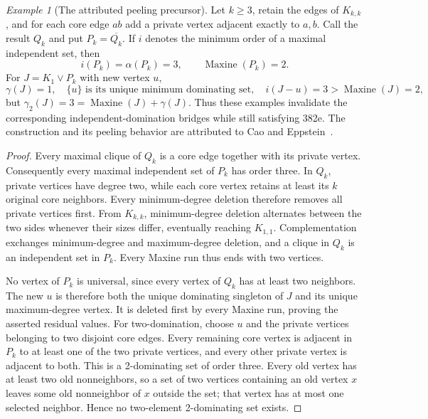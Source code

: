 \documentclass[11pt,a4paper]{article}
\theoremstyle{definition}\newtheorem{definition}[theorem]{Definition}
\theoremstyle{remark}\newtheorem{remark}[theorem]{Remark}
\newtheorem{example}[theorem]{Example}
\begin{document}
\begin{example}[The attributed peeling precursor]\label{late:382e:precursor}
Let $k\ge3$, retain the edges of $K_{k,k}$, and for each core edge $ab$
add a private vertex adjacent exactly to $a,b$. Call the result $Q_k$
and put $P_k=\overline{Q_k}$. If $i$ denotes the minimum order of a
maximal independent set, then
\[
 i(P_k)=\alpha(P_k)=3,\qquad \operatorname{Maxine}(P_k)=2.
\]
For $J=K_1\vee P_k$ with new vertex $u$,
\[
 \gamma(J)=1,\quad \{u\}\text{ is its unique minimum dominating set},
 \quad i(J-u)=3>\operatorname{Maxine}(J)=2,
\]
but $\gamma_2(J)=3=\operatorname{Maxine}(J)+\gamma(J)$.
Thus these examples invalidate the corresponding independent-domination
bridges while still satisfying 382e. The construction and its peeling
behavior are attributed to Cao and Eppstein~\cite{late:382e:ce}.
\end{example}
\begin{proof}
Every maximal clique of $Q_k$ is a core edge together with its private
vertex. Consequently every maximal independent set of $P_k$ has order
three. In $Q_k$, private vertices have degree two, while each core vertex
retains at least its $k$ original core neighbors. Every minimum-degree
deletion therefore removes all private vertices first. From $K_{k,k}$,
minimum-degree deletion alternates between the two sides whenever their
sizes differ, eventually reaching $K_{1,1}$. Complementation exchanges
minimum-degree and maximum-degree deletion, and a clique in $Q_k$ is an
independent set in $P_k$. Every Maxine run thus ends with two vertices.

No vertex of $P_k$ is universal, since every vertex of $Q_k$ has at least
two neighbors. The new $u$ is therefore both the unique dominating
singleton of $J$ and its unique maximum-degree vertex. It is deleted
first by every Maxine run, proving the asserted residual values.
For two-domination, choose $u$ and the private vertices belonging to two
disjoint core edges. Every remaining core vertex is adjacent in $P_k$
to at least one of the two private vertices, and every other private
vertex is adjacent to both. This is a 2-dominating set of order three.
Every old vertex has at least two old nonneighbors, so a set of two
vertices containing an old vertex $x$ leaves some old nonneighbor of $x$
outside the set; that vertex has at most one selected neighbor. Hence
no two-element 2-dominating set exists.
\end{proof}
\end{document}
